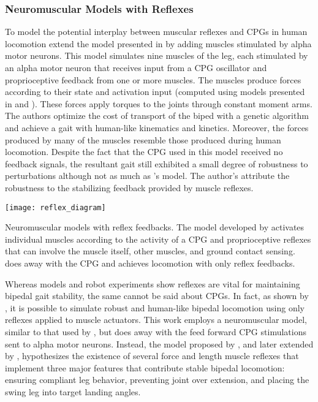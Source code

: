 \subsubsection{Neuromuscular Models with Reflexes}
To model the potential interplay between muscular reflexes and CPGs in human
locomotion \citet{ogihara2001generation} extend the model presented in
\citet{taga1991self} by adding muscles stimulated by alpha motor neurons. This
model simulates nine muscles of the leg, each stimulated by an alpha motor
neuron that receives input from a CPG oscillator and proprioceptive feedback
from one or more muscles. The muscles produce forces according to their state
and activation input (computed using models presented in
\citet{pierrynowski1985physiological} and \citet{davy1987dynamic}). These forces
apply torques to the joints through constant moment arms. The authors optimize
the cost of transport of the biped with a genetic algorithm and achieve a gait
with human-like kinematics and kinetics. Moreover, the forces produced by many
of the muscles resemble those produced during human locomotion. Despite the fact
that the CPG used in this model received no feedback signals, the resultant gait
still exhibited a small degree of robustness to perturbations although not as
much as \citeauthor{taga1991self}'s model. The author's attribute the robustness
to the stabilizing feedback provided by muscle reflexes. 
\begin{marginfigure}
    \centering
    \texttt{[image: reflex\_diagram]} 
    \caption{Neuromuscular models with reflex feedbacks. The model developed by
    \citet{ogihara2001generation} activates individual muscles according to the
    activity of a CPG and proprioceptive reflexes that can involve the muscle
    itself, other muscles, and ground contact sensing.  \citet{geyer2010muscle}
    does away with the CPG and achieves locomotion with only reflex feedbacks.}
    \label{fig:reflex_diagram}
\end{marginfigure}

Whereas models and robot experiments show reflexes are vital for maintaining
bipedal gait stability, the same cannot be said about CPGs. In fact, as shown by
\citet{geyer2010muscle}, it is possible to simulate robust and human-like
bipedal locomotion using only reflexes applied to muscle actuators. This work
employs a neuromuscular model, similar to that used by
\citet{ogihara2001generation}, but does away with the feed forward CPG
stimulations sent to alpha motor neurons. Instead, the model proposed by
\citet{geyer2010muscle}, and later extended by \citet{song2015neural},
hypothesizes the existence of several force and length muscle reflexes that
implement three major features that contribute stable bipedal locomotion:
ensuring compliant leg behavior, preventing joint over extension, and placing
the swing leg into target landing angles. 

